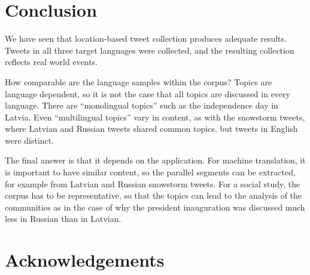 \documentclass[11pt,a4paper]{article}
\begin{document}
\section{Conclusion}

We have seen that location-based tweet collection produces adequate results. Tweets in all three target languages were collected, and the resulting collection reflects real world events.

How comparable are the language samples within the corpus? Topics are language dependent, so it is not the case that all topics are discussed in every language. There are ``monolingual topics'' such as the independence day in Latvia. Even ``multilingual topics'' vary in content, as with the snowstorm tweets, where Latvian and Russian tweets shared common topics, but tweets in English were distinct.

%
The final answer is that it depends on the application. For machine translation, it is important to have similar content, so the parallel segments can be extracted, for example from Latvian and Russian snowstorm tweets. For a social study, the corpus has to be representative, so that the topics can lead to the analysis of the communities as in the case of why the president inauguration was discussed much less in Russian than in Latvian.



\section*{Acknowledgements}
\end{document}
